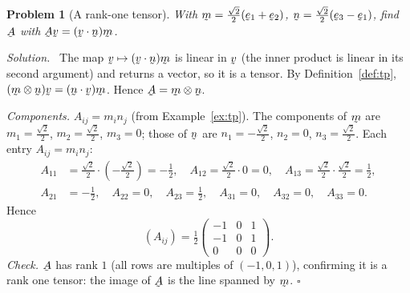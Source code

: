 \documentclass[17pt,a4paper]{extreport}
\DeclareRobustCommand{\vek}[1]{\underaccent{\tilde}{#1}}
\newcommand{\bv}{\vek{v}}
\newcommand{\be}{\vek{e}}
\newcommand{\bmv}{\vek{m}}
\newcommand{\bn}{\vek{n}}
\newcommand{\bA}{\vek{A}}
\newcommand{\ip}[2]{#1\cdot#2}
\theoremstyle{scplain}
\theoremstyle{scdefn}
\theoremstyle{scplain}
\newtheorem{problem}{Problem}
\newenvironment{solution}
 {\par\smallskip\noindent\textit{Solution.}\ }
 {\hfill$\square$\par\medskip}
\begin{document}
\begin{problem}[A rank-one tensor]
With $\bmv=\tfrac{\sqrt2}{2}(\be_1+\be_2)$,
$\bn=\tfrac{\sqrt2}{2}(\be_3-\be_1)$, find $\bA$ with
$\bA\bv=(\ip\bv\bn)\bmv$.
\end{problem}
\begin{solution}
The map $\bv\mapsto(\ip\bv\bn)\bmv$ is linear in $\bv$ (the inner product
is linear in its second argument) and returns a vector, so it is a tensor.
By Definition~\ref{def:tp}, $(\bmv\otimes\bn)\bv=(\ip\bn\bv)\bmv$. Hence
$\bA=\bmv\otimes\bn$.

\emph{Components.} $A_{ij}=m_in_j$ (from Example~\ref{ex:tp}). The
components of $\bmv$ are
$m_1=\tfrac{\sqrt2}{2}$, $m_2=\tfrac{\sqrt2}{2}$, $m_3=0$;
those of $\bn$ are $n_1=-\tfrac{\sqrt2}{2}$, $n_2=0$, $n_3=\tfrac{\sqrt2}{2}$.
Each entry $A_{ij}=m_in_j$:
\[
\begin{aligned}
A_{11}&=\tfrac{\sqrt2}{2}\cdot(-\tfrac{\sqrt2}{2})=-\tfrac12,\quad
A_{12}=\tfrac{\sqrt2}{2}\cdot0=0,\quad
A_{13}=\tfrac{\sqrt2}{2}\cdot\tfrac{\sqrt2}{2}=\tfrac12,\\
A_{21}&=-\tfrac12,\quad A_{22}=0,\quad A_{23}=\tfrac12,\quad
A_{31}=0,\quad A_{32}=0,\quad A_{33}=0.
\end{aligned}
\]
Hence
\[
(A_{ij})=\tfrac12\begin{pmatrix}-1&0&1\\-1&0&1\\0&0&0\end{pmatrix}.
\]
\emph{Check.} $\bA$ has rank $1$ (all rows are multiples of $(-1,0,1)$),
confirming it is a rank one tensor: the image of $\bA$ is the line
spanned by $\bmv$.
\end{solution}
\end{document}
